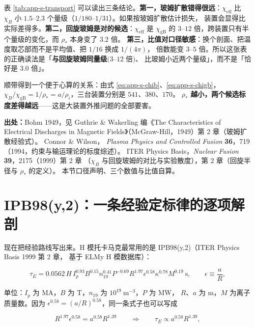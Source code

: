 表 \ref{tab:app-s-transport} 可以读出三条结论。\textbf{第一，玻姆扩散错得很远}：$\chi_{\mathrm{eff}}$
比 $\chi_B$ 小 $1.5$--$2.3$ 个量级（$1/180$--$1/31$）。如果按玻姆扩散估计损失，
装置会显得比实际差得多。\textbf{第二，回旋玻姆是对的候选}：$\chi_{\mathrm{eff}}$ 是
$\chi_{\mathrm{gB}}$ 的 $3$--$12$ 倍，跨装置只有半个量级的变化，而 $\rho_\ast$ 本身变了 $3.2$ 倍。
\textbf{第三，比值对口径敏感}：换个剖面、把温度取芯部而不是平均值、把 $1/16$ 换成 $1/(4\pi)$，
倍数能变 $3$--$5$ 倍。所以这张表的正确读法是「\textbf{与回旋玻姆同量级}$(3$--$12$ 倍$)$、
比玻姆小近两个量级」，而不是「恰好是 3.0 倍」。

顺带得到一个便于心算的关系：由式 \eqref{eq:app-s-chib}、\eqref{eq:app-s-chigb}，
$\chi_B/\chi_{\mathrm{gB}}=1/\rho_\ast=a/\rho_i$，三台装置分别是 $541$、$380$、$170$。
\textbf{$\rho_\ast$ 越小，两个候选标度差得越远}——这是大装置外推问题的全部要害。

{\footnotesize
\textbf{出处：}Bohm 1949，见 Guthrie \& Wakerling 编《The Characteristics of Electrical Discharges
in Magnetic Fields》（McGraw-Hill，1949）第 2 章（玻姆扩散经验式）。
Connor \& Wilson，
\textit{Plasma Physics and Controlled Fusion} \textbf{36}，719（1994，约束与输运理论的标度综述）。
ITER Physics Basis，\textit{Nuclear Fusion} \textbf{39}，2175（1999）第 2 章
（$\chi_B$ 与回旋玻姆的对比与实验散度），第 2 章（回旋半径与 $\rho_\ast$ 的定义）。
本节口径声明、三个数值与比值自算。
}


\section{IPB98(y,2)：一条经验定标律的逐项解剖}
\label{sec:app-s-ipb98}

现在把经验路线写出来。H 模托卡马克最常用的是 IPB98(y,2)（ITER Physics Basis 1999 第 2 章，
基于 ELMy H 模数据库）：

\begin{equation}
\tau_E=0.0562\,H\,I_p^{0.93}B^{0.15}n_{19}^{0.41}P^{-0.69}
R^{1.97}\epsilon^{0.58}\kappa^{0.78}M^{0.19}\ \mathrm{s},
\qquad \epsilon\equiv\frac{a}{R},
\label{eq:app-s-ipb98}
\end{equation}

单位：$I_p$ 为 MA，$B$ 为 T，$n_{19}$ 为 $10^{19}\ \mathrm{m^{-3}}$，$P$ 为 MW，
$R$、$a$ 为 m，$M$ 为离子质量数。因为 $\epsilon^{0.58}=(a/R)^{0.58}$，同一条式子也可以写成

\begin{equation}
R^{1.97}\epsilon^{0.58}=a^{0.58}R^{1.39}
\qquad\Longrightarrow\qquad
\tau_E\propto a^{0.58}R^{1.39},
\label{eq:app-s-ipb98b}
\end{equation}

